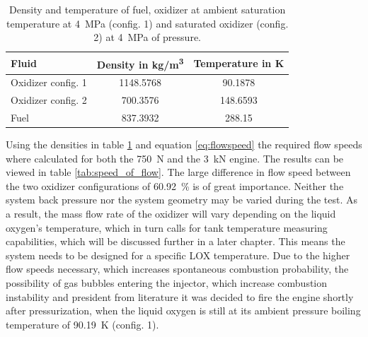                 \begin{table}[h] 
                \centering
                    \begin{tabular}{ |l | c | c|} 
                        \hline
                        Fluid  & Density in \unit{kg/m^3} & Temperature in \unit{K}\\
                        \hline
                        Oxidizer config. 1 & 1148.5768 & 90.1878\\
                        \hline
                        Oxidizer config. 2 & 700.3576  & 148.6593\\  
                        \hline
                        Fuel & 837.3932 & 288.15\\
                        \hline
                    \end{tabular} 
                    \caption{Density and temperature of fuel, oxidizer at ambient saturation temperature at \qty{4}{MPa} (config. 1) and saturated oxidizer (config. 2) at \qty{4}{MPa} of pressure.}
                    \label{tab:densities}
                \end{table}
                Using the densities in table \ref{tab:densities} and equation \ref{eq:flowspeed} the required flow speeds where calculated for both the \qty{750}{N} and the \qty{3}{kN} engine. The results can be viewed in table \ref{tab:speed_of_flow}. The large difference in flow speed between the two oxidizer configurations of \qty{60.92}{\%} is of great importance. Neither the system back pressure nor the system geometry may be varied during the test. As a result, the mass flow rate of the oxidizer will vary depending on the liquid oxygen's temperature, which in turn calls for tank temperature measuring capabilities, which will be discussed further in a later chapter. This means the system needs to be designed for a specific LOX temperature. Due to the higher flow speeds necessary, which increases spontaneous combustion probability, the possibility of gas bubbles entering the injector, which increase combustion instability and president from literature \cite[203]{Sutton:2021} it was decided to fire the engine shortly after pressurization, when the liquid oxygen is still at its ambient pressure boiling temperature of \qty{90.19}{K} (config. 1). 
